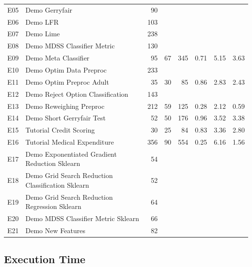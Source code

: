 \documentclass[sigconf,review]{acmart}
\begin{document}
\begin{table}[]
\begin{tabular}{clrrrrrr}
		E05 & Demo Gerryfair                                    & 90  &    &     &      &      &      \\
		E06 & Demo LFR                                          & 103 &    &     &      &      &      \\
		E07 & Demo   Lime                                       & 238 &    &     &      &      &      \\
		E08 & Demo MDSS Classifier Metric                       & 130 &    &     &      &      &      \\
		E09 & Demo Meta Classifier                              & 95  & 67 & 345 & 0.71 & 5.15 & 3.63 \\
		E10 & Demo Optim Data Preproc                           & 233 &    &     &      &      &      \\
		E11 & Demo Optim Preproc Adult                          & 35  & 30 & 85  & 0.86 & 2.83 & 2.43 \\
		E12 & Demo Reject Option Classification                 & 143 &    &     &      &      &      \\
		E13 & Demo Reweighing Preproc                           & 212 & 59 & 125 & 0.28 & 2.12 & 0.59 \\
		E14 & Demo Short Gerryfair Test                         & 52  & 50 & 176 & 0.96 & 3.52 & 3.38 \\
		E15 & Tutorial Credit Scoring                           & 30  & 25 & 84  & 0.83 & 3.36 & 2.80 \\
		E16 & Tutorial Medical Expenditure                      & 356 & 90 & 554 & 0.25 & 6.16 & 1.56 \\
		E17 & Demo Exponentiated Gradient Reduction Sklearn     & 54  &    &     &      &      &      \\
		E18 & Demo Grid Search Reduction Classification Sklearn & 52  &    &     &      &      &      \\
		E19 & Demo Grid Search Reduction Regression Sklearn     & 64  &    &     &      &      &      \\
		E20 & Demo MDSS Classifier Metric Sklearn               & 66  &    &     &      &      &      \\
		E21 & Demo New Features                                 & 82  &    &     &      &      &      \\ \hline
	\end{tabular}
\end{table}


\subsection{Execution Time}
\label{sec:execution_time}
\end{document}
